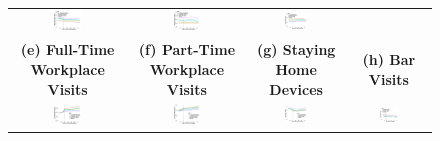 \documentclass[9pt,twoside,lineno]{pnas-new}
\theoremstyle{definition}
\begin{document}
\begin{figure}[ht]
{\begin{minipage}{\linewidth}
\begin{tabular}{cccc}
  \includegraphics[width=0.25\textwidth]{tables_and_figures/schoolmode-event-restaurant}&  
  \includegraphics[width=0.25\textwidth]{tables_and_figures/schoolmode-event-recreation}&  
  \includegraphics[width=0.25\textwidth]{tables_and_figures/schoolmode-event-church}\\  
    \textbf{(e) Full-Time Workplace Visits  }&\textbf{(f) Part-Time Workplace Visits     }&\textbf{(g) Staying Home Devices }&\textbf{(h) Bar Visits } \\ %
  \includegraphics[width=0.25\textwidth]{tables_and_figures/schoolmode-event-fullwork}&
  \includegraphics[width=0.25\textwidth]{tables_and_figures/schoolmode-event-partwork}&  
  \includegraphics[width=0.25\textwidth]{tables_and_figures/schoolmode-event-home}&  
  \includegraphics[width=0.25\textwidth]{tables_and_figures/schoolmode-event-bar}\\  

\end{tabular}
\end{minipage}}
\end{figure}
\end{document}
